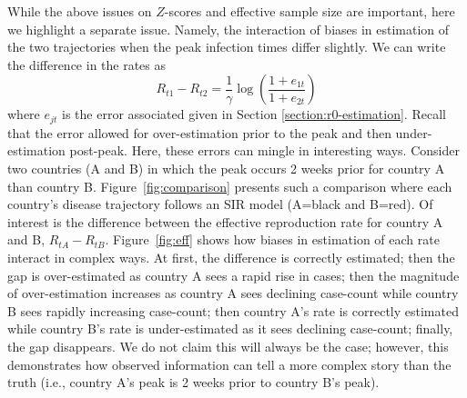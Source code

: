 \documentclass[12pt]{amsart}
\numberwithin{equation}{section}
\theoremstyle{plain}
\begin{document}
While the above issues on $Z$-scores and effective sample size are important, here we highlight a separate issue.  Namely, the interaction of biases in estimation of the two trajectories when the peak infection times differ slightly.  We can write the difference in the rates as
$$
R_{t1} - R_{t2} = \frac{1}{\gamma} \log \left( \frac{1 + e_{1t}}{1+e_{2t}} \right)
$$
where $e_{jt}$ is the error associated given in Section \ref{section:r0-estimation}.  Recall that the error allowed for over-estimation prior to the peak and then under-estimation post-peak.  Here, these errors can mingle in interesting ways.  Consider two countries (A and B) in which the peak occurs 2 weeks prior for country A than country B.  Figure~\ref{fig:comparison} presents such a comparison where each country's disease trajectory follows an SIR model (A=black and B=red). Of interest is the difference between the effective reproduction rate for country A and B, $R_{tA} - R_{tB}$. Figure~\ref{fig:eff} shows how biases in estimation of each rate interact in complex ways.  At first, the difference is correctly estimated; then the gap is over-estimated as country A sees a rapid rise in cases; then the magnitude of over-estimation increases as country A sees declining case-count while country B sees rapidly increasing case-count; then country A's rate is correctly estimated while country B's rate is under-estimated as it sees declining case-count; finally, the gap disappears.  We do not claim this will always be the case; however, this demonstrates how observed information can tell a more complex story than the truth (i.e., country A's peak is 2 weeks prior to country B's peak).
\end{document}
